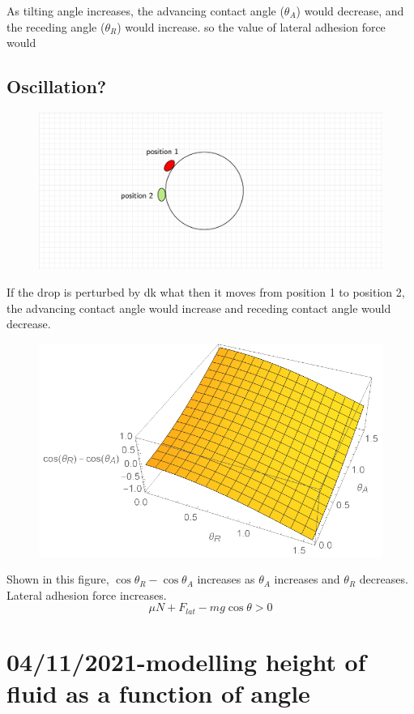 \documentclass{scrartcl}
\begin{document}
As tilting angle increases, the advancing contact angle ($\theta_A$) would decrease, and the receding angle ($\theta_R$) would increase. so the value of lateral adhesion force would 

\subsection{Oscillation?}
\begin{figure}[h]
    \includegraphics[width=\linewidth]{diagram-20211030 (1).png}
\end{figure}
    
If the drop is perturbed by dk what then it moves from position 1 to position 2, the advancing contact angle would increase and receding contact angle would decrease. 

\begin{figure}[H]
    \centering
    \includegraphics[scale=1]{cos(x)-cos(y).pdf}
\end{figure}
Shown in this figure, $\cos \theta_R-\cos \theta_A$ increases as $\theta_A$ increases and $\theta_R$ decreases. Lateral adhesion force increases. 
\begin{equation}
    \mu N + F_{lat}-mg\cos\theta> 0
\end{equation}

\section{04/11/2021-modelling height of fluid as a function of angle}
\end{document}
